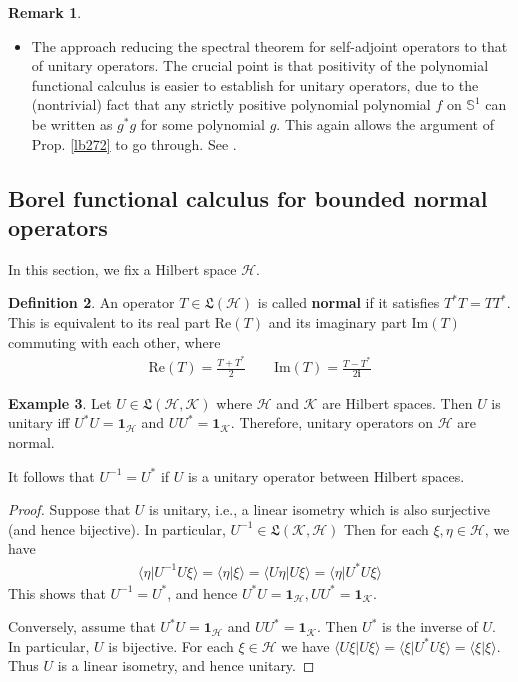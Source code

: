 \documentclass[12pt,b5paper,notitlepage]{article}
\theoremstyle{definition}
\newtheorem{df}{Definition}[subsection]
\newtheorem{eg}[df]{Example}
\newtheorem{rem}[df]{Remark}
\theoremstyle{plain}
\newcommand{\fk}{\mathfrak}
\newcommand{\idt}{\mathbf{1}}
\newcommand{\bk}[1]{\langle {#1}\rangle}
\newcommand{\im}{\mathbf{i}}
\newcommand{\Sbb}{{\mathbb S}}
\newcommand{\Real}{\mathrm{Re}}
\newcommand{\Imag}{\mathrm{Im}}
\newcommand{\MH}{\mathcal H}
\newcommand{\MK}{\mathcal K}
\newcommand{\hqed}{\hfill\qedsymbol}
\numberwithin{equation}{section}
\begin{document}
\begin{rem}
\begin{itemize}
\item The approach reducing the spectral theorem for self-adjoint operators to that of unitary operators. The crucial point is that positivity of the polynomial functional calculus is easier to establish for unitary operators, due to the (nontrivial) fact that any strictly positive polynomial polynomial $f$ on $\Sbb^1$ can be written as $g^*g$ for some polynomial $g$. This again allows the argument of Prop. \ref{lb272} to go through. See \cite{Xia}.
\end{itemize}
\hqed 
\end{rem}








\subsection{Borel functional calculus for bounded normal operators}\label{lb259}


In this section, we fix a Hilbert space $\MH$.

\begin{df}
An operator $T\in\fk L(\MH)$ is called \textbf{normal}  if it satisfies $T^*T=TT^*$. This is equivalent to its real part $\Real(T)$  and its imaginary part $\Imag(T)$  commuting with each other, where
\begin{align*}
\Real(T)=\frac{T+T^*}2\qquad \Imag(T)=\frac{T-T^*}{2\im}
\end{align*}
\end{df}


\begin{eg}\label{lb311}
Let $U\in\fk L(\MH,\MK)$ where $\MH$ and $\MK$ are Hilbert spaces. Then $U$ is unitary iff $U^*U=\idt_\MH$ and $UU^*=\idt_\MK$. Therefore, unitary operators on $\MH$ are normal.
\end{eg}

It follows that $U^{-1}=U^*$ if $U$ is a unitary operator between Hilbert spaces.

\begin{proof}
Suppose that $U$ is unitary, i.e., a linear isometry which is also surjective (and hence bijective). In particular, $U^{-1}\in\fk L(\MK,\MH)$ Then for each $\xi,\eta\in\MH$, we have
\begin{align*}
\bk{\eta|U^{-1}U\xi}=\bk{\eta|\xi}=\bk{U\eta|U\xi}=\bk{\eta|U^*U\xi}
\end{align*}
This shows that $U^{-1}=U^*$, and hence $U^*U=\idt_\MH,UU^*=\idt_\MK$.

Conversely, assume that $U^*U=\idt_\MH$ and $UU^*=\idt_\MK$. Then $U^*$ is the inverse of $U$. In particular, $U$ is bijective. For each $\xi\in\MH$ we have $\bk{U\xi|U\xi}=\bk{\xi|U^*U\xi}=\bk{\xi|\xi}$. Thus $U$ is a linear isometry, and hence unitary.
\end{proof}
\end{document}
